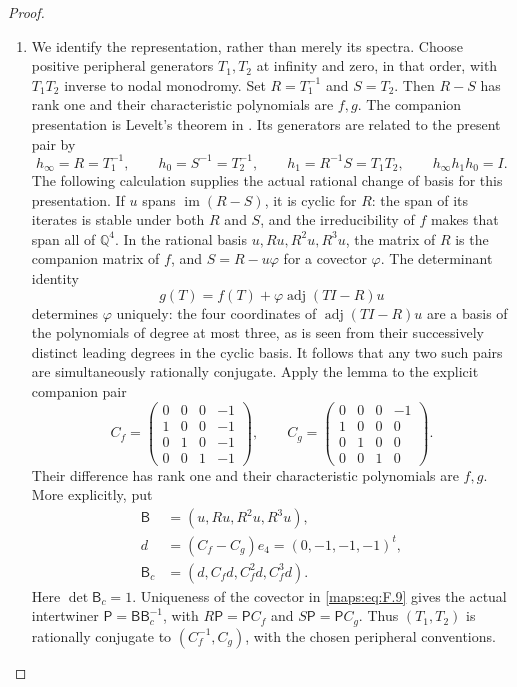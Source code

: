 \documentclass[11pt,a4paper]{article}
\theoremstyle{definition}
\begin{document}
\begin{proof}
\begin{enumerate}[label=\arabic*.]
\item We identify the representation, rather than merely its spectra.
Choose positive peripheral generators $T_1,T_2$ at infinity and
zero, in that order, with $T_1T_2$ inverse to nodal monodromy.
Set $R=T_1^{-1}$ and $S=T_2$.  Then $R-S$ has rank one and their
characteristic polynomials are $f,g$.  The companion presentation
is Levelt's theorem in \cite[Theorem 3.5, pp.~331--332;
Corollary 3.6, p.~332]{BeukersHeckman1989}.  Its generators are
related to the present pair by
\[
 h_\infty=R=T_1^{-1},\qquad h_0=S^{-1}=T_2^{-1},\qquad
 h_1=R^{-1}S=T_1T_2,\qquad h_\infty h_1h_0=I.
\]
The following calculation supplies the actual rational change
of basis for this presentation.
If $u$ spans $\operatorname{im}(R-S)$, it is cyclic for $R$:
the span of its iterates is stable under both $R$ and $S$, and
the irreducibility of $f$ makes that span all of $\mathbb Q^4$.
In the rational basis $u,Ru,R^2u,R^3u$, the matrix of $R$ is
the companion matrix of $f$, and $S=R-u\varphi$ for a covector
$\varphi$.  The determinant identity
\[
 g(T)=f(T)+\varphi\operatorname{adj}(TI-R)u
 \tag{F.9}\label{maps:eq:F.9}
\]
determines $\varphi$ uniquely: the four coordinates of
$\operatorname{adj}(TI-R)u$ are a basis of the polynomials of
degree at most three, as is seen from their successively distinct
leading degrees in the cyclic basis.  It follows that any two
such pairs are simultaneously rationally conjugate.  Apply the
lemma to the explicit companion pair
\[
 C_f=\begin{pmatrix}
 0&0&0&-1\\1&0&0&-1\\0&1&0&-1\\0&0&1&-1
 \end{pmatrix},\qquad
 C_g=\begin{pmatrix}
 0&0&0&-1\\1&0&0&0\\0&1&0&0\\0&0&1&0
 \end{pmatrix}.
 \tag{F.10}\label{maps:eq:F.10}
\]
Their difference has rank one and their characteristic polynomials
are $f,g$.  More explicitly, put
\[
 \begin{aligned}
 \mathsf B&=(u,Ru,R^2u,R^3u),\\
 d&=(C_f-C_g)e_4=(0,-1,-1,-1)^t,\\
 \mathsf B_c&=(d,C_fd,C_f^2d,C_f^3d).
 \end{aligned}
\]
Here $\det\mathsf B_c=1$.  Uniqueness of the covector in
\eqref{maps:eq:F.9} gives the actual intertwiner
$\mathsf P=\mathsf B\mathsf B_c^{-1}$, with
$R\mathsf P=\mathsf P C_f$ and $S\mathsf P=\mathsf P C_g$.
Thus $(T_1,T_2)$ is rationally conjugate to
$(C_f^{-1},C_g)$, with the chosen peripheral conventions.


\end{enumerate}
\end{proof}
\end{document}
